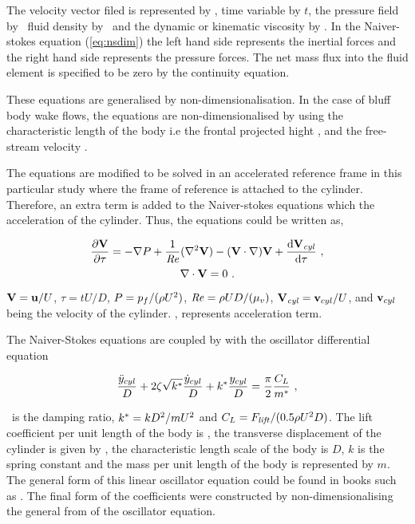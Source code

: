   The velocity vector filed is represented by \vecu, time variable by $t$, the pressure field by \pres \ fluid density by \density \ and the dynamic or kinematic viscosity by \dynvis. In the Naiver-stokes equation (\ref{eq:nsdim}) the left hand side represents the inertial forces and the right hand side represents the pressure forces. The net mass flux into the fluid element is specified to be zero by the continuity equation. 
  
  These equations are generalised by non-dimensionalisation. In the case of bluff body wake flows, the equations are non-dimensionalised by using the characteristic length of the body i.e the frontal projected hight \diam, and the free-stream velocity \Ufree. 
  
  The equations are modified  to  be solved in an accelerated reference frame in this particular study where the frame of reference is attached to the cylinder. Therefore, an extra term is added to the Naiver-stokes equations which the acceleration of the cylinder. Thus, the equations could be written as, 
  
  \begin{equation} \centering
  \label{eq:nsfinal}
  \pderiv{\vecV}{\tau} = -\grad{\Pres} + \frac{1}{\Rey}(\gradsq{\vecV}) - (\vecV\cdot\nabla)\vecV + \accframe ~,
  \end{equation}
  \begin{equation}
  \label{eq:continuity}
  \nabla\cdot\mathbf{V} = 0~.
  \end{equation}
  
   $\mathbf{V} = \mathbf{u}/U$, $\tau = tU/D$, $P = p_{f}/(\rho
  U^{2})$, $\mathit{Re} = \rho UD/(\mu_{v})$, $\mathbf{V}_{\mathit{cyl}} = \mathbf{v}_{cyl}/U$, and 
  $\mathbf{v}_{cyl}$ being the velocity of the cylinder. \accframe, represents acceleration term.  
  
  The Naiver-Stokes equations are coupled by with the oscillator differential equation 
  
  \begin{equation} \centering
  \label{eq:cyl_eom}
  \frac{\ddot{y}_{cyl}}{D} + 2\damping\sqrt{\kstar}\frac{\dot{y}_{cyl}}{D} + \kstar\frac{\ycyl}{D} = \frac{\pi}{2}\frac{\clift}{\mstar} ~,
  \end{equation}

  
  
  
    \damping \ is the damping ratio,  $k^{*}=kD^{2}/mU^{2}$ and
    $C_{L} = F_{\mathit{lift}}/(0.5\rho U^{2}D)$. The lift
    coefficient per unit length of the body is \clift, the transverse displacement of the cylinder is given by \ycyl,  the characteristic length scale of the body is $D$, $k$ is the spring constant and the mass per unit length of the body is represented by $m$. The general form of this linear oscillator equation could be found in books such as  \citet{Naudascher:94}. The final form of the coefficients were constructed by non-dimensionalising the general from of the oscillator equation. 
    
